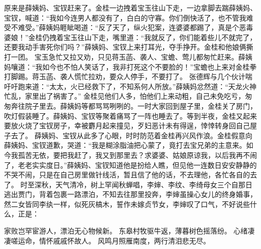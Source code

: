\documentclass[12pt,oneside]{book}
\begin{document}
原来是薛姨妈、宝钗赶来了。金桂一边拽着宝玉往山下走，一边拿脚去踹薛姨妈、宝钗，喊道：“我如今连男人都没有了，白白的守寡。你们倒快活了，也不管我难受不难受。”薛姨妈睚眦喝道：“反了天了，纵火犯案，连婆婆都踢了，真是个恶毒婆娘！”金桂仍拽着宝玉往山下走，嘴里道：“我就反了，你们能着些儿不就完了，还要我动手害死你们吗？”薛姨妈、宝钗上来打耳光，夺手挣开。金桂和他娘俩撕打一团。
宝玉急忙又拉又劝，只见蒋玉菡、袭人、宝蟾、莺儿都匆忙赶来。薛姨妈嚷道：“我如今也不怕人笑话了，我非打死这个不要脸的！”宝蟾也上来对金桂拳打脚踢。蒋玉菡、袭人慌忙拉劝，要众人停手，不要打了。
张德辉与几个伙计喘吁吁跑来道：“太太，火已经救下了，不知系何人所放。”薛姨妈忿然道：“天龙火神忙乱，家里出了祸害了。”
金桂见他们人多，怕他们上来动粗，自己未免吃亏，匆匆奔往院子里去。薛姨妈等都骂骂咧咧的。一时大家回到屋子里，金桂关了房门，吹灯假装睡了。薛姨妈、宝钗等聚着痛骂了一阵也睡去了。等到半夜，金桂又起来要放火烧了宝钗房子，幸被麝月起来撞见，歹妇恶计未有得逞，悻悻转身回自己屋子去了。
薛姨妈、宝钗从此多了心眼，时时防范着金桂再兴风作浪。金桂假意向薛姨妈、宝钗道歉，哭道：“我是糊涂脂油把心蒙了，竟打去宝兄弟的主意来。如今我孤苦无依，要把我赶了，我又到那里去？求婆婆、姑娘原谅我，以后我再不闹了，老老实实度日。”薛姨妈、宝钗知道他是扮给人瞧，但见他一连数日安安静静的不哭不闹，只是在自己房里做针线活，暂且信了他的话，不去理他，各忙各自的去了。
时至深秋，天气清冷，树上罕闻秋蝉唱，李婶、李纹、李绮母女三个自那日逃出贾门，背着包裹一路漂泊，不知去往那里投奔，李婶虽操心女儿的终身婚事，然二女皆同李纨一样，似死灰槁木，誓作未嫁贞节女，李婶叹了口气，不好说些什么，正是：

家败岂罕宦游人，漂泊无心物候新。
东皋村牧驱牛返，薄暮树色摇落纷。
心绪凄凄嗟运命，情怀戚戚怀故人。
风鸣月照雁南度，两行清泪悲无尽。
\end{document}
